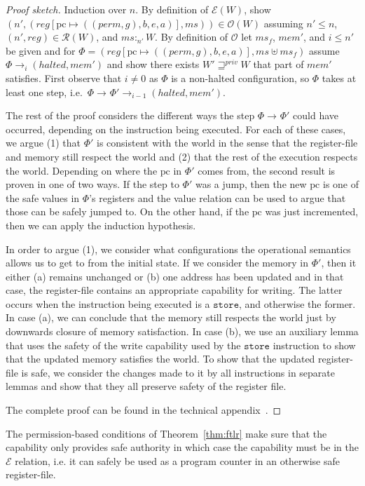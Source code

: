 \documentclass[format=acmsmall, review=true, screen=true]{acmart}
\newcommand{\update}[2]{[#1 \mapsto #2]}
\newcommand{\var}[1]{\mathit{#1}}
\newcommand{\hs}{\var{ms}}
\newcommand{\ms}{\hs}
\newcommand{\gl}{\var{g}}
\newcommand{\pcreg}{\mathrm{pc}}
\newcommand{\addr}{\var{a}}
\newcommand{\start}{\var{b}}
\newcommand{\addrend}{\var{e}}
\newcommand{\mem}{\var{mem}}
\newcommand{\reg}{\var{reg}}
\newcommand{\heap}{\var{mem}}
\newcommand{\perm}{\var{perm}}
\newcommand{\halted}{\mathit{halted}}
\newcommand{\futurestr}{\mathbin{\sqsupseteq}^{\var{priv}}}
\newcommand{\heapSat}[3][\heap]{#1 :_{#2} #3}
\newcommand{\asmType}{\plaindom{AsmType}}
\newcommand{\plaindom}[1]{\mathrm{#1}}
\newcommand{\intr}[2]{\mathcal{#1}}
\newcommand{\exprintr}[1]{\intr{E}{#1}}
\newcommand{\regintr}[1]{\intr{R}{#1}}
\newcommand{\stder}{\exprintr{\asmType}}
\newcommand{\stdrr}{\regintr{\asmType}}
\newcommand{\observations}{\mathcal{O}}
\newcommand{\npair}[2][n]{\left(#1,#2 \right)}
\newcommand{\step}[1][]{\rightarrow_{#1}}
\newenvironment{toplas}{}{}
\begin{document}
\begin{toplas}
  \begin{proof}[Proof sketch]
    Induction over $n$. By definition of $\stder(W)$, show
    $\npair[n']{(\reg\update{\pcreg}{((\perm,\gl),\start,\addrend,\addr)},\ms)}
    \in \observations(W)$ assuming $n' \leq n$, $\npair[n']{\reg} \in \stdrr(W)$, and
    $\heapSat[\ms]{n'}{W}$. By definition of $\observations$ let $\ms_f$,
    $\mem'$, and $i \leq n'$ be given and for
    $\Phi = (\reg\update{\pcreg}{((\perm,\gl),\start,\addrend,\addr)},\ms \uplus
    \ms_f)$ assume $\Phi \step[i]
    (\halted,\mem')$ and show there exists $W' \futurestr W$ that part of
    $\mem'$ satisfies. First observe that $i \neq 0$ as $\Phi$ is a non-halted
    configuration, so $\Phi$ takes at least one step, i.e.\ $\Phi \step
    \Phi' \step[i-1] (\halted,\mem')$.

    The rest of the proof considers the different ways the step $\Phi \step
    \Phi'$ could have occurred, depending on the instruction being executed. For
    each of these cases, we argue (1) that $\Phi'$ is consistent with the world
    in the sense that the register-file and memory still respect the world and
    (2) that the rest of the execution respects the world. Depending on where
    the $\pcreg$ in $\Phi'$ comes from, the second result is proven in one of
    two ways. If the step to $\Phi'$ was a jump, then the new $\pcreg$ is one of
    the safe values in $\Phi$'s registers and the value relation can be used to
    argue that those can be safely jumped to. On the other hand, if the $\pcreg$
    was just incremented, then we can apply the induction hypothesis.

    In order to argue (1), we consider what configurations the operational
    semantics allows us to get to from the initial state. If we consider the
    memory in $\Phi'$, then it either (a) remains unchanged or (b) one address
    has been updated and in that case, the register-file contains an appropriate
    capability for writing. The latter occurs when the instruction being
    executed is a $\texttt{store}$, and otherwise the former. In case (a), we
    can conclude that the memory still respects the world just by downwards
    closure of memory satisfaction. In case (b), we use an auxiliary lemma that
    uses the safety of the write capability used by the $\texttt{store}$
    instruction to show that the updated memory satisfies the world. To show
    that the updated register-file is safe, we consider the changes made to it
    by all instructions in separate lemmas and show that they all preserve
    safety of the register file.

    The complete proof can be found in the technical appendix~\citep{technical_appendix}.
  \end{proof}
\end{toplas}
The permission-based conditions of Theorem~\ref{thm:ftlr} make sure that the
capability only provides safe authority in which case the capability must be in
the $\stder$ relation, i.e. it can safely be used as a program counter in an
otherwise safe register-file.
\end{document}
